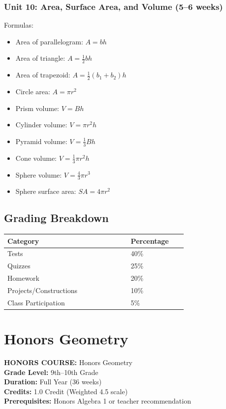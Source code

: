 \documentclass[12pt,oneside]{book}
\begin{document}
\subsection*{Unit 10: Area, Surface Area, and Volume (5--6 weeks)}
Formulas:
\begin{itemize}[leftmargin=2em]
    \item Area of parallelogram: $A = bh$
    \item Area of triangle: $A = \tfrac{1}{2}bh$
    \item Area of trapezoid: $A = \tfrac{1}{2}(b_1 + b_2)h$
    \item Circle area: $A = \pi r^2$
    \item Prism volume: $V = Bh$
    \item Cylinder volume: $V = \pi r^2 h$
    \item Pyramid volume: $V = \tfrac{1}{3}Bh$
    \item Cone volume: $V = \tfrac{1}{3}\pi r^2 h$
    \item Sphere volume: $V = \tfrac{4}{3}\pi r^3$
    \item Sphere surface area: $SA = 4\pi r^2$
\end{itemize}

\section{Grading Breakdown}
\begin{center}
\begin{tabular}{L{0.55\linewidth}L{0.25\linewidth}}
\toprule
\textbf{Category} & \textbf{Percentage} \\
\midrule
Tests & 40\% \\
Quizzes & 25\% \\
Homework & 20\% \\
Projects/Constructions & 10\% \\
Class Participation & 5\% \\
\bottomrule
\end{tabular}
\end{center}

\chapter{Honors Geometry}

\noindent\textbf{HONORS COURSE:} Honors Geometry\\
\textbf{Grade Level:} 9th--10th Grade\\
\textbf{Duration:} Full Year (36 weeks)\\
\textbf{Credits:} 1.0 Credit (Weighted 4.5 scale)\\
\textbf{Prerequisites:} Honors Algebra 1 or teacher recommendation
\end{document}
